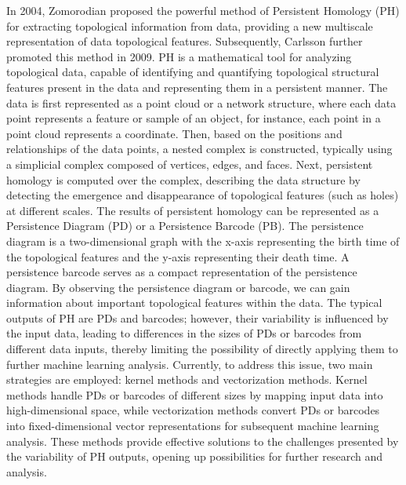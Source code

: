 \documentclass[5GeSdc,ASOC,numref,printGA,printHL,CASflow,nocrossmark,longtitle,PROOF]{/usr/local/texlive/iTemplates/01-Templates/01-Els-Jnl/01-Standard_Templates/V1/ELS_MDL5-V1-6}
\begin{document}
\begin{articlestyle}
In 2004, Zomorodian \cite{zomorodian2004computing} proposed the powerful method of Persistent Homology (PH) for extracting topological information from data, providing a new multiscale representation of data topological features. Subsequently, Carlsson \cite{carlsson2009topology} further promoted this method in 2009. PH is a mathematical tool for analyzing topological data, capable of identifying and quantifying topological structural features present in the data and representing them in a persistent manner. The data is first represented as a point cloud or a network structure, where each data point represents a feature or sample of an object, for instance, each point in a point cloud represents a coordinate. Then, based on the positions and relationships of the data points, a nested complex is constructed, typically using a simplicial complex composed of vertices, edges, and faces. Next, persistent homology is computed over the complex, describing the data structure by detecting the emergence and disappearance of topological features (such as holes) at different scales. The results of persistent homology can be represented as a Persistence Diagram (PD) or a Persistence Barcode (PB). The persistence diagram is a two-dimensional graph with the x-axis representing the birth time of the topological features and the y-axis representing their death time. A persistence barcode serves as a compact representation of the persistence diagram. By observing the persistence diagram or barcode, we can gain information about important topological features within the data.  
The typical outputs of PH are PDs and barcodes; however, their variability is influenced by the input data, leading to differences in the sizes of PDs or barcodes from different data inputs, thereby limiting the possibility of directly applying them to further machine learning analysis. Currently, to address this issue, two main strategies are employed: kernel methods and vectorization methods. Kernel methods handle PDs or barcodes of different sizes by mapping input data into high-dimensional space, while vectorization methods convert PDs or barcodes into fixed-dimensional vector representations for subsequent machine learning analysis. These methods provide effective solutions to the challenges presented by the variability of PH outputs, opening up possibilities for further research and analysis.



\end{articlestyle}
\end{document}
